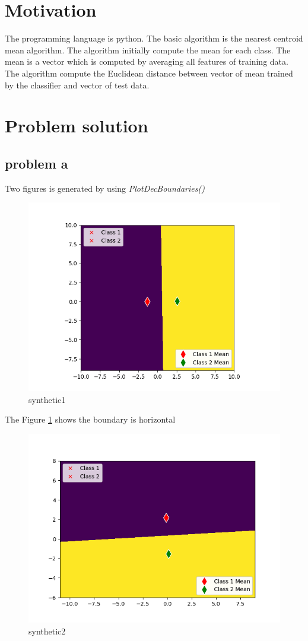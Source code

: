 \documentclass{article}
\begin{document}
	\section{Motivation}
	The programming language is python. The basic algorithm is the nearest centroid mean algorithm. The algorithm initially compute the mean for each class. The mean is a vector which is computed by averaging all features of training data. The algorithm compute the Euclidean distance between vector of mean trained by the classifier and vector of test data. 
	\section{Problem solution}
	\subsection{problem a}
	Two figures is generated by using \textit{PlotDecBoundaries()}
	\begin{figure}[hbt!]
		\includegraphics[width=\linewidth]{images/synthetic1.png}
		\caption{synthetic1}
		\label{fig:synthetic1}
	\end{figure}
The Figure \ref{fig:synthetic1} shows the boundary is horizontal 
	\begin{figure}[hbt!]
		\includegraphics[width=\linewidth]{images/synthetic2.png}
		\caption{synthetic2}
		\label{fig:synthetic2}
	\end{figure}
\end{document}
